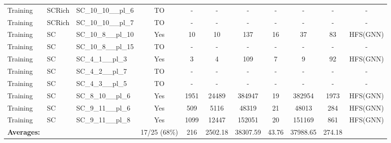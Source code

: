 \documentclass{article}
\begin{document}
\begin{tabular}{lllcccccccc}
Training & SCRich & SC\_10\_10\_\_pl\_6 & TO & - & - & - & - & - & - & - \\
Training & SCRich & SC\_10\_10\_\_pl\_7 & TO & - & - & - & - & - & - & - \\
Training & SC & SC\_10\_8\_\_pl\_10 & Yes & 10 & 10 & 137 & 16 & 37 & 83 & HFS(GNN) \\
Training & SC & SC\_10\_8\_\_pl\_15 & TO & - & - & - & - & - & - & - \\
Training & SC & SC\_4\_1\_\_pl\_3 & Yes & 3 & 4 & 109 & 7 & 9 & 92 & HFS(GNN) \\
Training & SC & SC\_4\_2\_\_pl\_7 & TO & - & - & - & - & - & - & - \\
Training & SC & SC\_4\_3\_\_pl\_5 & TO & - & - & - & - & - & - & - \\
Training & SC & SC\_8\_10\_\_pl\_6 & Yes & 1951 & 24489 & 384947 & 19 & 382954 & 1973 & HFS(GNN) \\
Training & SC & SC\_9\_11\_\_pl\_6 & Yes & 509 & 5116 & 48319 & 21 & 48013 & 284 & HFS(GNN) \\
Training & SC & SC\_9\_11\_\_pl\_8 & Yes & 1099 & 12447 & 152051 & 20 & 151169 & 861 & HFS(GNN) \\
\textbf{Averages:} & & & 17/25 (68\%) & 216 & 2502.18 & 38307.59 & 43.76 & 37988.65 & 274.18 & \\
\bottomrule
\end{tabular}
\newpage
\end{document}
